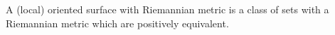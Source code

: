 A (local) oriented surface with Riemannian metric is a class of sets with a Riemannian metric which are positively equivalent.
